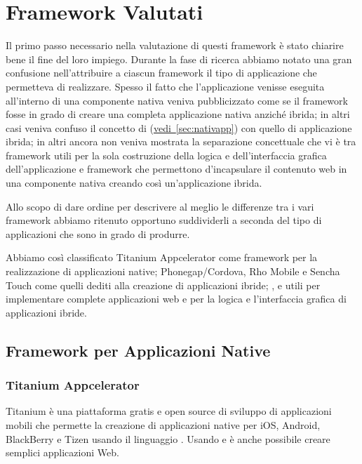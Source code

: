 \chapter{Framework Valutati}
	Il primo passo necessario nella valutazione di questi framework è stato 
	chiarire bene il fine del loro impiego. Durante la fase di ricerca abbiamo 
	notato una gran confusione nell'attribuire a ciascun framework il tipo di
	applicazione che permetteva di realizzare. Spesso il fatto che 
	l'applicazione venisse eseguita all'interno di una componente nativa veniva 
	pubblicizzato come se il framework fosse in grado di creare una completa 
	applicazione nativa anziché ibrida; in altri casi 
	veniva confuso il concetto di \crosscomp 
	(\hyperref[sec:nativapp]{vedi~\ref{sec:nativapp}}) con quello di 
	applicazione ibrida; in altri ancora non veniva mostrata la separazione 
	concettuale che vi è tra framework utili per la sola costruzione della 
	logica e dell'interfaccia grafica dell'applicazione e framework che 
	permettono d'incapsulare il contenuto web in una componente nativa creando 
	così un'applicazione ibrida.
	
	Allo scopo di dare ordine per descrivere al meglio le differenze tra i vari 
	framework abbiamo ritenuto opportuno suddividerli a seconda del tipo di 
	applicazioni che sono in grado di produrre.
	
	Abbiamo così classificato Titanium Appcelerator come framework per la 
	realizzazione di applicazioni native; Phonegap/Cordova, Rho Mobile e Sencha 
	Touch come quelli dediti alla creazione di applicazioni ibride; \jqm{},
	\kendomob{} e \phonejs{} utili per implementare complete 
	applicazioni web e per la logica e l'interfaccia grafica di applicazioni 
	ibride.

	\section{Framework per Applicazioni Native}
		
		\subsection{Titanium Appcelerator}
		\label{sec:titanium}
			Titanium è una piattaforma gratis e open source di sviluppo di 
			applicazioni mobili che permette la creazione di applicazioni native
			\crossplat{} per iOS, Android, BlackBerry e Tizen usando il 
			linguaggio \js{}. Usando \js{} e \html{} è anche possibile
			creare semplici applicazioni Web.
			
